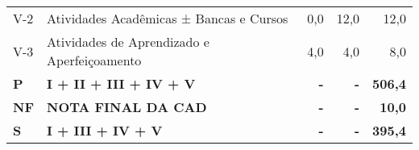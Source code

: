 \documentclass[11pt,a4paper]{article}
\begin{document}
\begin{table}[ht]
{\begin{tabular}{|l|l|r|r|r|}
  V-2 & Atividades Acadêmicas ± Bancas e Cursos & 0,0 & 12,0 & 12,0 \\ 
  V-3 & Atividades de Aprendizado e Aperfeiçoamento & 4,0 & 4,0 & 8,0 \\ 
  \textbf{P} & \textbf{I + II + III + IV + V} & \textbf{-} & \textbf{-} & \textbf{506,4} \\ 
  \textbf{NF} & \textbf{NOTA FINAL DA CAD} & \textbf{-} & \textbf{-} & \textbf{10,0} \\ 
  \textbf{S} & \textbf{I + III + IV + V} & \textbf{-} & \textbf{-} & \textbf{395,4} \\ 
   \hline
\end{tabular}
}
\end{table}
\end{document}
